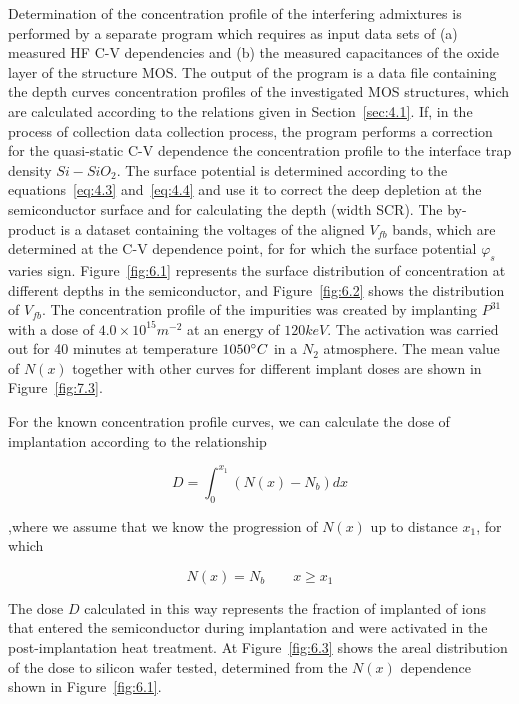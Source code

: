 Determination of the concentration profile of the interfering
admixtures is performed by a separate program which requires as input
data sets of (a) measured HF C-V dependencies and (b) the measured
capacitances of the oxide layer of the structure MOS\@. The output of
the program is a data file containing the depth curves
concentration profiles of the investigated MOS structures, which are
calculated according to the relations given in
Section~\ref{sec:4.1}. If, in the process of collection data
collection process, the program performs a correction for the
quasi-static C-V dependence the concentration profile to the interface
trap density $Si-SiO_2$. The surface potential is determined according
to the equations~\ref{eq:4.3} and~\ref{eq:4.4} and use it to correct
the deep depletion at the semiconductor surface and for calculating
the depth (width SCR). The by-product is a dataset containing the
voltages of the aligned $V_{fb}$ bands, which are determined at the
C-V dependence point, for for which the surface potential $\varphi_s$
varies sign. Figure~\ref{fig:6.1} represents the surface distribution
of concentration at different depths in the semiconductor, and
Figure~\ref{fig:6.2} shows the distribution of $V_{fb}$. The
concentration profile of the impurities was created by implanting
$P^{31}$ with a dose of $4.0 \times 10^{15} m^{-2}$ at an energy of
$120 keV$. The activation was carried out for 40 minutes at
temperature $1050 \degree C$ in a $N_2$ atmosphere. The mean value of
$N(x)$ together with other curves for different implant doses are
shown in Figure~\ref{fig:7.3}.

For the known concentration profile curves, we can calculate the
dose of implantation according to the relationship

\begin{equation}\label{eq:6.1}
  D = \int_{0}^{x_{1}}(N(x) - N_{b}) dx
\end{equation}

,where we assume that we know the progression of $N(x)$ up to distance
$x_{1}$, for which

\begin{equation}\label{eq:6.2}
  N(x) = N_{b} \qquad {x \ge x_{1}}
\end{equation}

The dose $D$ calculated in this way represents the fraction of
implanted of ions that entered the semiconductor during implantation
and were activated in the post-implantation heat treatment. At
Figure~\ref{fig:6.3} shows the areal distribution of the dose to
silicon wafer tested, determined from the $N(x)$ dependence shown in
Figure~\ref{fig:6.1}.

